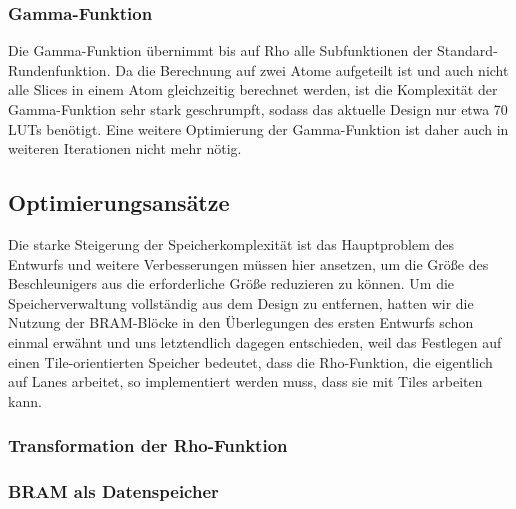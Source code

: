 \subsubsection{Gamma-Funktion}
Die Gamma-Funktion übernimmt bis auf Rho alle Subfunktionen der Standard-Rundenfunktion. Da die Berechnung auf zwei Atome aufgeteilt ist und auch nicht alle Slices in einem Atom gleichzeitig berechnet werden,
ist die Komplexität der Gamma-Funktion sehr stark geschrumpft, sodass das aktuelle Design nur etwa 70 LUTs benötigt. Eine weitere Optimierung der Gamma-Funktion ist daher auch in weiteren Iterationen nicht mehr nötig.

\subsection{Optimierungsansätze}
Die starke Steigerung der Speicherkomplexität ist das Hauptproblem des Entwurfs und weitere Verbesserungen müssen hier ansetzen, um die Größe des Beschleunigers aus die erforderliche Größe reduzieren zu können.
Um die Speicherverwaltung vollständig aus dem Design zu entfernen, hatten wir die Nutzung der BRAM-Blöcke in den Überlegungen des ersten Entwurfs schon einmal erwähnt und uns letztendlich dagegen entschieden,
weil das Festlegen auf einen Tile-orientierten Speicher bedeutet, dass die Rho-Funktion, die eigentlich auf Lanes arbeitet, so implementiert werden muss, dass sie mit Tiles arbeiten kann.
\subsubsection{Transformation der Rho-Funktion}


\subsubsection{BRAM als Datenspeicher}
